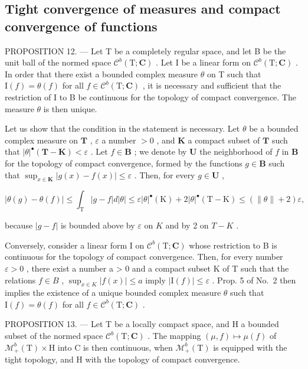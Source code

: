 \subsection{Tight convergence of measures and compact convergence of functions}

PROPOSITION 12. --- Let T be a completely regular space, and let B be the unit ball of the normed space \(\mathcal{C}^{b}(\mathrm{T};\mathbf{C})\) . Let I be a linear form on \(\mathcal{C}^{b}(\mathrm{T};\mathbf{C})\) . In order that there exist a bounded complex measure \(\theta\) on T such that \(\mathrm{I}(f)=\theta(f)\) for all \(f\in\mathcal{C}^{b}(\mathrm{T};\mathbf{C})\) , it is necessary and sufficient that the restriction of I to B be continuous for the topology of compact convergence. The measure \(\theta\) is then unique.

Let us show that the condition in the statement is necessary. Let \(\theta\) be a bounded complex measure on \(\mathbf{T}\) , \(\varepsilon\) a number \(>0\) , and \(\mathbf{K}\) a compact subset of \(\mathbf{T}\) such that \(|\theta|^{\bullet}(\mathbf{T} - \mathbf{K}) < \varepsilon\) . Let \(f \in \mathbf{B}\) ; we denote by \(\mathbf{U}\) the neighborhood of \(f\) in \(\mathbf{B}\) for the topology of compact convergence, formed by the functions \(g \in \mathbf{B}\) such that \(\sup_{x \in \mathbf{K}} |g(x) - f(x)| \leqslant \varepsilon\) . Then, for every \(g \in \mathbf{U}\) ,

\[
| \theta (g) - \theta (f) | \leqslant \int_ {\mathrm{T}} | g - f | d | \theta | \leqslant \varepsilon | \theta | ^ {\bullet} (\mathrm{K}) + 2 | \theta | ^ {\bullet} (\mathrm{T} - \mathrm{K}) \leqslant (\| \theta \| + 2) \varepsilon ,
\]

because \(|g - f|\) is bounded above by \(\varepsilon\) on \(K\) and by 2 on \(T - K\) .

Conversely, consider a linear form I on \(\mathcal{C}^{b}(\mathrm{T};\mathbf{C})\) whose restriction to B is continuous for the topology of compact convergence. Then, for every number \(\varepsilon > 0\) , there exist a number a \textgreater{} 0 and a compact subset K of T such that the relations \(f \in B\) , \(\sup_{x \in K} |f(x)| \leqslant a\) imply \(|\mathrm{I}(f)| \leqslant \varepsilon\) . Prop. 5 of No.~2 then implies the existence of a unique bounded complex measure \(\theta\) such that \(\mathrm{I}(f) = \theta(f)\) for all \(f \in \mathcal{C}^{b}(\mathrm{T};\mathbf{C})\) .

PROPOSITION 13. --- Let T be a locally compact space, and H a bounded subset of the normed space \(\mathcal{C}^{b}(\mathrm{T};\mathbf{C})\) . The mapping \((\mu,f)\mapsto\mu(f)\) of \(\mathcal{M}_{+}^{b}(\mathrm{T})\times\mathrm{H}\) into C is then continuous, when \(\mathcal{M}_{+}^{b}(\mathrm{T})\) is equipped with the tight topology, and H with the topology of compact convergence.


